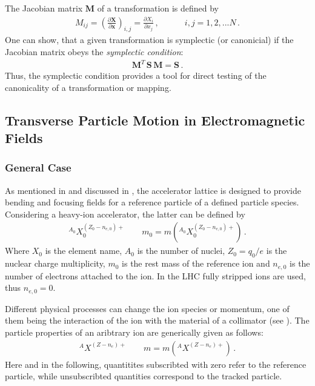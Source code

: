 The Jacobian matrix $\mathbf{M}$ of a transformation is defined by 
\begin{align}
M_{ij} = \left( \frac{\partial \mathbf{X}}{\partial \mathbf{x}} \right)_{i,j} = \frac{\partial X_i}{\partial x_j} \, , \quad \quad \quad i,j=1,2,...N \, .
\end{align}
One can show, that a given transformation is symplectic (or canonicial) if the Jacobian matrix obeys the \emph{symplectic condition}:
\begin{align}
\mathbf{M}^T \, \mathbf{S} \, \mathbf{M} =  \mathbf{S} \, .
\end{align} 
Thus, the symplectic condition provides a tool for direct testing of the canonicality of a transformation or mapping.

\subsection{Transverse Particle Motion in Electromagnetic Fields}
\subsubsection{General Case}
As mentioned in  and discussed in , the accelerator lattice is designed to provide bending and focusing fields for a reference particle of a defined particle species. Considering a heavy-ion accelerator, the latter can be defined by
\begin{align}
^{A_0}X_0^{(Z_0-n_{e,0})+} \quad \quad m_0 = m\left( ^{A_0}X_0^{(Z_0-n_{e,0})+} \right) \, .
\end{align}
Where $X_0$ is the element name, $A_0$ is the number of nuclei, $Z_0=q_0/e$ is the nuclear charge multiplicity, $m_0$ is the rest mass of the reference ion and $n_{e,0}$ is the number of electrons attached to the ion. In the LHC fully stripped \lead ions are used, thus $n_{e,0}=0$. 


Different physical processes can change the ion species or momentum, one of them being the interaction of the ion with the material of a collimator (see ). The particle properties of an aribtrary ion are generically given as follows:
\begin{align}
^{A}X^{(Z-n_{e})+} \quad \quad m = m\left( ^{A}X^{(Z-n_e)+} \right) \, .
\end{align}
Here and in the following, quantitites subscribted with zero refer to the reference particle, while unsubscribted quantities correspond to the tracked particle. 


